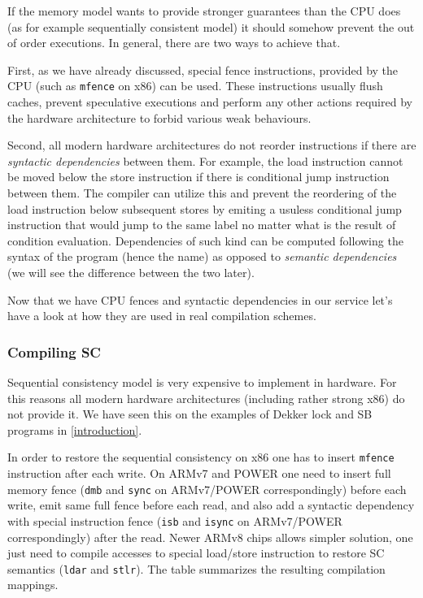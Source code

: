 \documentclass[a4paper,twoside,11pt]{article}
\numberwithin{equation}{section}
\begin{document}
If the memory model wants to provide stronger guarantees 
than the CPU does (as for example sequentially consistent model)
it should somehow prevent the out of order executions.
In general, there are two ways to achieve that. 

First, as we have already discussed, special fence instructions,
provided by the CPU (such as \texttt{mfence} on x86) can be used.
These instructions usually flush caches, prevent speculative executions
and perform any other actions required by the hardware architecture
to forbid various weak behaviours.

Second, all modern hardware architectures do not reorder instructions 
if there are \emph{syntactic dependencies} between them. 
For example, the load instruction cannot be moved below 
the store instruction if there is conditional jump instruction between them.
The compiler can utilize this and prevent 
the reordering of the load instruction below subsequent stores
by emiting a usuless conditional jump instruction that would jump 
to the same label no matter what is the result of condition evaluation.
Dependencies of such kind can be computed following the 
syntax of the program (hence the name) as opposed 
to \emph{semantic dependencies} 
(we will see the difference between the two later).

Now that we have CPU fences and syntactic dependencies in our service
let's have a look at how they are used in real compilation schemes.

\subsubsection{Compiling SC}

Sequential consistency model is very expensive to implement in hardware. 
For this reasons all modern hardware architectures (including rather strong x86) do not provide it. 
We have seen this on the examples of Dekker lock and SB programs in \ref{introduction}.

In order to restore the sequential consistency on x86 one has to 
insert \texttt{mfence} instruction after each write.
On ARMv7 and POWER one need to insert full memory fence
(\texttt{dmb} and \texttt{sync} on ARMv7/POWER correspondingly)
before each write,
emit same full fence before each read, and also
add a syntactic dependency with special instruction fence 
(\texttt{isb} and \texttt{isync} on ARMv7/POWER correspondingly)
after the read.
Newer ARMv8 chips allows simpler solution, 
one just need to compile accesses to special 
load/store instruction to restore SC semantics
(\texttt{ldar} and \texttt{stlr}).
The table summarizes the resulting compilation mappings.
\end{document}
